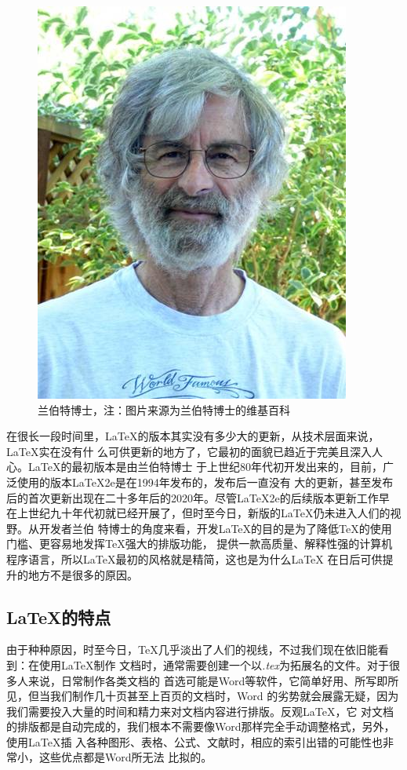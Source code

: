 \begin{figure}
      \centering
      \includegraphics[scale=0.6]{images/Leslie_Lamport.jpeg}
      \caption{兰伯特博士，注：图片来源为兰伯特博士的维基百科}
\end{figure}

在很长一段时间里，LaTeX的版本其实没有多少大的更新，从技术层面来说，LaTeX实在没有什
么可供更新的地方了，它最初的面貌已趋近于完美且深入人心。LaTeX的最初版本是由兰伯特博士
于上世纪80年代初开发出来的，目前，广泛使用的版本LaTeX2e是在1994年发布的，发布后一直没有
大的更新，甚至发布后的首次更新出现在二十多年后的2020年。尽管LaTeX2e的后续版本更新工作早
在上世纪九十年代初就已经开展了，但时至今日，新版的LaTeX仍未进入人们的视野。从开发者兰伯
特博士的角度来看，开发LaTeX的目的是为了降低TeX的使用门槛、更容易地发挥TeX强大的排版功能，
提供一款高质量、解释性强的计算机程序语言，所以LaTeX最初的风格就是精简，这也是为什么LaTeX
在日后可供提升的地方不是很多的原因。

\subsection{\LaTeX 的特点}
由于种种原因，时至今日，TeX几乎淡出了人们的视线，不过我们现在依旧能看到：在使用LaTeX制作
文档时，通常需要创建一个以\emph{.tex}为拓展名的文件。对于很多人来说，日常制作各类文档的
首选可能是Word等软件，它简单好用、所写即所见，但当我们制作几十页甚至上百页的文档时，Word
的劣势就会展露无疑，因为我们需要投入大量的时间和精力来对文档内容进行排版。反观LaTeX，它
对文档的排版都是自动完成的，我们根本不需要像Word那样完全手动调整格式，另外，使用LaTeX插
入各种图形、表格、公式、文献时，相应的索引出错的可能性也非常小，这些优点都是Word所无法
比拟的。

